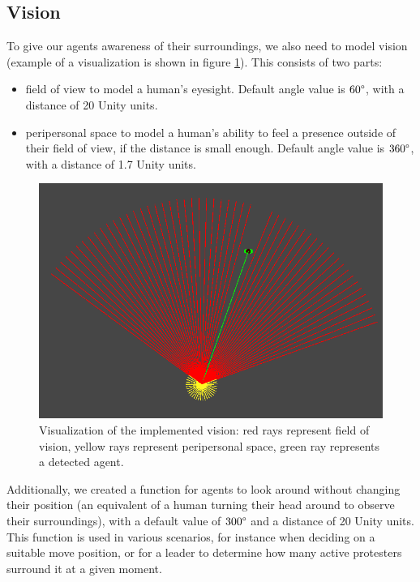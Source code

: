 \documentclass[9pt]{pnas-new}
\begin{document}
\subsection*{Vision}
To give our agents awareness of their surroundings, we also need to model vision (example of a visualization is shown in figure \ref{vision}). This consists of two parts: 
\begin{itemize}
    \item field of view to model a human's eyesight. Default angle value is \begin{math}60\degree\end{math}, with a distance of 20 Unity units.
    \item peripersonal space to model a human's ability to feel a presence outside of their field of view, if the distance is small enough. Default angle value is \begin{math}360\degree\end{math}, with a distance of 1.7 Unity units.
\end{itemize}

\begin{figure}[H]
\centering
\includegraphics[width=0.95\columnwidth]{vision.png}
\caption{Visualization of the implemented vision: red rays represent field of vision, yellow rays represent peripersonal space, green ray represents a detected agent.}
\label{vision}
\end{figure}

Additionally, we created a function for agents to look around without changing their position (an equivalent of a human turning their head around to observe their surroundings), with a default value of \begin{math}300\degree\end{math} and a distance of 20 Unity units. This function is used in various scenarios, for instance when deciding on a suitable move position, or for a leader to determine how many active protesters surround it at a given moment. 
\end{document}
